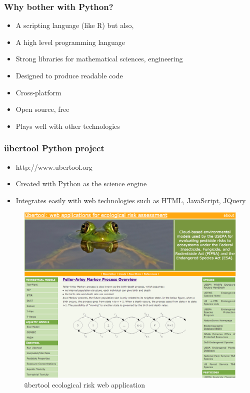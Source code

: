 \documentclass{beamer}
\begin{document}
\begin{frame}[fragile]
\frametitle{Why bother with Python?}
\begin{itemize}
\item A scripting language (like R) but also, 
\item A high level programming language
\item Strong libraries for mathematical sciences, engineering
\item Designed to produce readable code 
\item Cross-platform 
\item Open source, free
\item Plays well with other technologies
\end{itemize} 
\end{frame}

\begin{frame}[fragile]
\frametitle{\"{u}bertool Python project}
\begin{itemize}
  \item{http://www.ubertool.org}
  \item{Created with Python as the science engine}
  \item{Integrates easily with web technologies such as HTML, JavaScript, JQuery}
\end{itemize} 
\begin{figure}
 \includegraphics[scale=0.18]{ubertool.png} 
 \caption{\"{u}bertool ecological risk web application}
\end{figure}
\end{frame}
\end{document}
